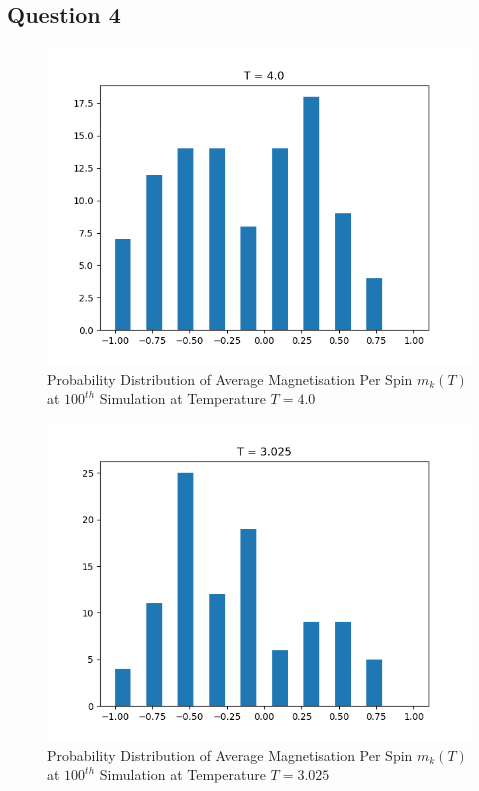 \documentclass[a4paper]{article}
\numberwithin{equation}{section}
\begin{document}
\subsection{Question 4}
\begin{figure}[H]
	\centering
	\includegraphics[scale=0.7]{probdist1.png}
	\caption{Probability Distribution of Average Magnetisation Per Spin $m_k(T)$ at $100^{th}$ Simulation at Temperature $T=4.0$}
	\label{fig:probdist1}
\end{figure}
\begin{figure}[H]
	\centering
	\includegraphics[scale=0.7]{probdist2.png}
	\caption{Probability Distribution of Average Magnetisation Per Spin $m_k(T)$ at $100^{th}$ Simulation at Temperature $T=3.025$}
	\label{fig:probdist2}
\end{figure}
\end{document}

